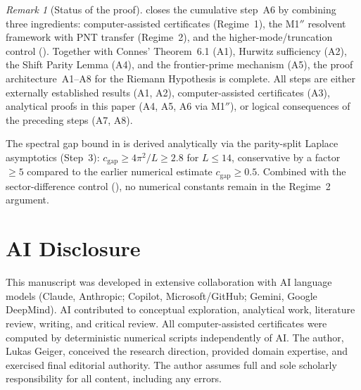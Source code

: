 \documentclass[12pt,a4paper]{article}
\theoremstyle{definition}
\theoremstyle{remark}
\newtheorem{remark}[theorem]{Remark}
\begin{document}
\begin{remark}[Status of the proof]
\label{rem:M1-status}
 closes the cumulative step~A6 by combining three ingredients: computer-assisted certificates (Regime~1), the M1$''$ resolvent framework with PNT transfer (Regime~2), and the higher-mode/truncation control (). Together with Connes' Theorem~6.1 (A1), Hurwitz sufficiency (A2), the Shift Parity Lemma (A4), and the frontier-prime mechanism (A5), the proof architecture~A1--A8 for the Riemann Hypothesis is complete. All steps are either externally established results (A1, A2), computer-assisted certificates (A3), analytical proofs in this paper (A4, A5, A6 via M1$''$), or logical consequences of the preceding steps (A7, A8).

The spectral gap bound in  is derived analytically via the parity-split Laplace asymptotics (Step~3): $c_{\mathrm{gap}} \geq 4\pi^2/L \geq 2.8$ for $L \leq 14$, conservative by a factor $\geq 5$ compared to the earlier numerical estimate $c_{\mathrm{gap}} \geq 0.5$. Combined with the sector-difference control (), no numerical constants remain in the Regime~2 argument.
\end{remark}


\section*{AI Disclosure}

This manuscript was developed in extensive collaboration with AI language models (Claude, Anthropic; Copilot, Microsoft/GitHub; Gemini, Google DeepMind). AI contributed to conceptual exploration, analytical work, literature review, writing, and critical review. All computer-assisted certificates were computed by deterministic numerical scripts independently of AI. The author, Lukas Geiger, conceived the research direction, provided domain expertise, and exercised final editorial authority. The author assumes full and sole scholarly responsibility for all content, including any errors.




\end{document}
